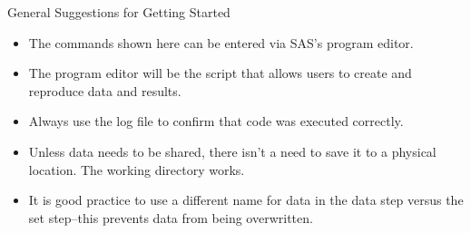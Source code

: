 \documentclass{beamer}
\begin{document}
\begin{frame}{General Suggestions for Getting Started}
\begin{itemize}

    \item The commands shown here can be entered via SAS's program editor.
        \item The program editor will be the script that allows users to create and reproduce data and results.
        \item Always use the log file to confirm that code was executed correctly.
        \item Unless data needs to be shared, there isn't a need to save it to a physical location.  The working directory works.
        \item It is good practice to use a different name for data in the data step versus the set step--this prevents data from being overwritten.

\end{itemize}
\end{frame}
\end{document}
